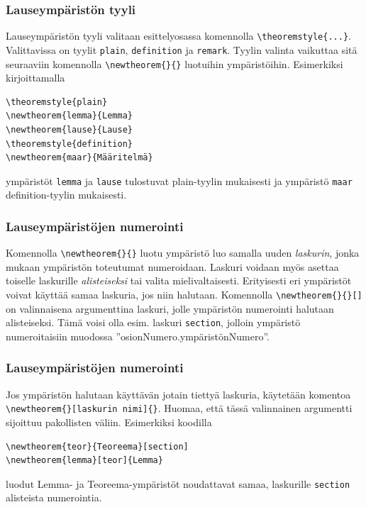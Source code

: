 \begin{frame}[fragile]
    \frametitle{Lauseympäristön tyyli}
    Lauseympäristön tyyli valitaan esittelyosassa komennolla \verb-\theoremstyle{...}-. Valittavissa on tyylit \verb-plain-, \verb-definition- ja \verb-remark-. Tyylin valinta vaikuttaa sitä seuraaviin komennolla \verb-\newtheorem{}{}- luotuihin ympäristöihin.
    \vaihto
    Esimerkiksi kirjoittamalla
    \pause
    \begin{Verbatim}[frame=single]
\theoremstyle{plain}
\newtheorem{lemma}{Lemma}
\newtheorem{lause}{Lause}
\theoremstyle{definition}
\newtheorem{maar}{Määritelmä}
    \end{Verbatim}
    \pause
    ympäristöt \verb-lemma- ja \verb-lause- tulostuvat plain-tyylin mukaisesti ja ympäristö \verb-maar- definition-tyylin mukaisesti.
\end{frame}
\begin{frame}[fragile]
    
\end{frame}
\begin{frame}[fragile]
    \frametitle{Lauseympäristöjen numerointi}
    Komennolla \verb-\newtheorem{}{}- luotu ympäristö luo samalla uuden \emph{laskurin}, jonka mukaan ympäristön toteutumat numeroidaan. 
    \vaihto
    Laskuri voidaan myös asettaa toiselle laskurille \emph{alisteiseksi} tai valita mielivaltaisesti. Erityisesti eri ympäristöt voivat käyttää samaa laskuria, jos niin halutaan.
    \vaihto
    Komennolla \verb-\newtheorem{}{}[]- on valinnaisena argumenttina laskuri, jolle ympäristön numerointi halutaan alisteiseksi. Tämä voisi olla esim. laskuri \verb-section-, jolloin ympäristö numeroitaisiin muodossa ''osionNumero.ympäristönNumero''.
\end{frame}
\begin{frame}[fragile]
    \frametitle{Lauseympäristöjen numerointi}
    Jos ympäristön halutaan käyttävän jotain tiettyä laskuria, käytetään komentoa \verb-\newtheorem{}[laskurin nimi]{}-. Huomaa, että tässä valinnainen argumentti sijoittuu pakollisten väliin. 
    \vaihto
    Esimerkiksi koodilla
    \begin{Verbatim}[frame=single]
\newtheorem{teor}{Teoreema}[section]
\newtheorem{lemma}[teor]{Lemma}
    \end{Verbatim}
    luodut Lemma- ja Teoreema-ympäristöt noudattavat samaa, laskurille \verb-section- alisteista numerointia.
\end{frame}
